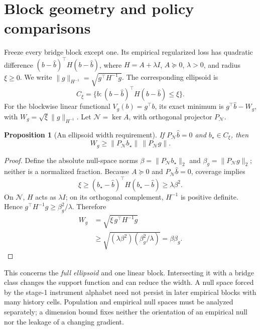 \documentclass[11pt]{article}
\newtheorem{proposition}{Proposition}
\newcommand{\Pn}{P_{\mathcal N}}
\begin{document}
\section{Block geometry and policy comparisons}
Freeze every bridge block except one. Its empirical regularized loss has
quadratic difference $(b-\hat b)^\top H(b-\hat b)$, where
$H=A+\lambda I$, $A\succeq0$, $\lambda>0$, and radius $\xi\ge0$.
We write $\lVert g\rVert_{H^{-1}}=\sqrt{g^\top H^{-1}g}$.
The corresponding ellipsoid is
\begin{equation}
 C_\xi=\{b:(b-\hat b)^\top H(b-\hat b)\le\xi\}.
\end{equation}
For the blockwise linear functional $V_g(b)=g^\top b$, its exact minimum is
$g^\top\hat b-W_g$, with $W_g=\sqrt{\xi}\|g\|_{H^{-1}}$.
Let $\mathcal N=\ker A$, with orthogonal projector $\Pn$.

\begin{proposition}[An ellipsoid width requirement]
If $\Pn\hat b=0$ and $b_\star\in C_\xi$, then
\begin{equation}
 W_g\ge\|\Pn b_\star\|\,\|\Pn g\|.
 \label{eq:floor}
\end{equation}
\end{proposition}
\begin{proof}
Define the absolute null-space norms
$\beta=\lVert\Pn b_\star\rVert_2$ and
$\beta_g=\lVert\Pn g\rVert_2$; neither is a normalized fraction.
Because $A\succeq0$ and $\Pn\hat b=0$, coverage implies
\[
 \xi\ge(b_\star-\hat b)^\top H(b_\star-\hat b)
 \ge\lambda\beta^2.
\]
On $\mathcal N$, $H$ acts as $\lambda I$; on its orthogonal complement,
$H^{-1}$ is positive definite. Hence
$g^\top H^{-1}g\ge\beta_g^2/\lambda$. Therefore
\begin{equation*}
 \begin{aligned}
 W_g&=\sqrt{\xi\,g^\top H^{-1}g}\\
    &\ge\sqrt{(\lambda\beta^2)(\beta_g^2/\lambda)}
     =\beta\beta_g.
 \end{aligned}
\end{equation*}
\end{proof}

This concerns the \emph{full ellipsoid} and one linear block. Intersecting it
with a bridge class changes the support function and can reduce the width.
A null space forced by the stage-1 instrument alphabet need not persist in
later empirical blocks with many history cells. Population and empirical null
spaces must be analyzed separately; a dimension bound fixes neither the
orientation of an empirical null nor the leakage of a changing gradient.
\end{document}
